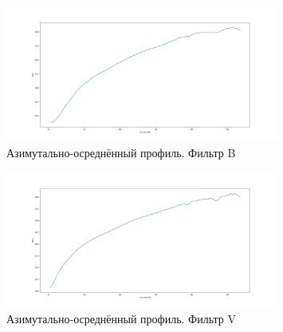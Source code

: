 \documentclass [12pt, a4paper] {article}
\theoremstyle{definition}
\begin{document}
		\begin{figure}
		\centering
			\includegraphics[width = 0.8\textwidth]{B_slice_dI(R).png}
						\caption{Азимутально-осреднённый профиль. Фильтр B}
					\end{figure}
		\begin{figure}
		\centering
			\includegraphics[width = 0.8\textwidth]{V_slice_dI(R).png}
			\caption{Азимутально-осреднённый профиль. Фильтр V}
\end{figure}
\end{document}
